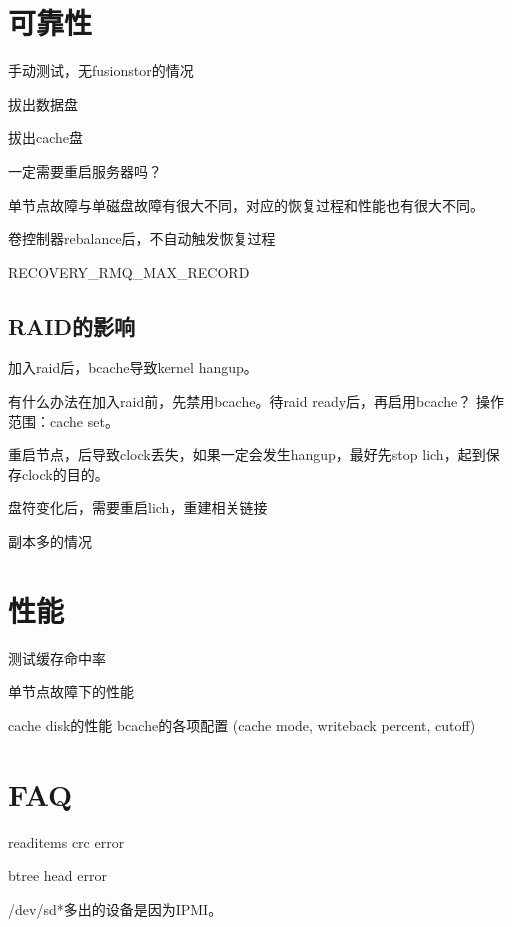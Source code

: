 \section{可靠性}

手动测试，无fusionstor的情况
\begin{enumbox}
\item 拔出数据盘
\item 拔出cache盘
\end{enumbox}

一定需要重启服务器吗？

单节点故障与单磁盘故障有很大不同，对应的恢复过程和性能也有很大不同。

卷控制器rebalance后，不自动触发恢复过程

RECOVERY\_RMQ\_MAX\_RECORD

\subsection{RAID的影响}


加入raid后，bcache导致kernel hangup。

有什么办法在加入raid前，先禁用bcache。待raid ready后，再启用bcache？
操作范围：cache set。

重启节点，后导致clock丢失，如果一定会发生hangup，最好先stop lich，起到保存clock的目的。

盘符变化后，需要重启lich，重建相关链接

副本多的情况

\section{性能}

测试缓存命中率

单节点故障下的性能
\begin{enumbox}
cache disk的性能
bcache的各项配置 (cache mode, writeback percent, cutoff)
\end{enumbox}

\section{FAQ}

readitems crc error

btree head error

/dev/sd*多出的设备是因为IPMI。
